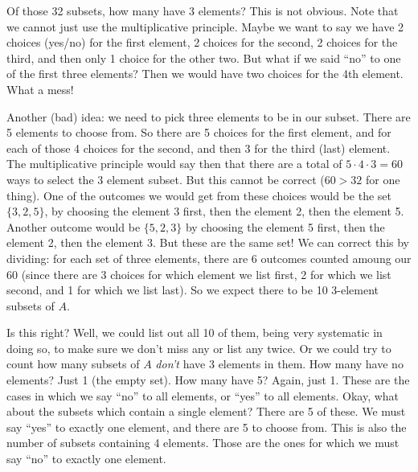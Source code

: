 \documentclass[10pt,]{book}
\theoremstyle{plain}
\theoremstyle{definition}
\theoremstyle{definition}
\theoremstyle{definition}
\numberwithin{equation}{chapter}
\begin{document}
        Of those 32 subsets, how many have 3 elements? This is not obvious. Note that we cannot just use the multiplicative principle. Maybe we want to say we have 2 choices (yes/no) for the first element, 2 choices for the second, 2 choices for the third, and then only 1 choice for the other two. But what if we said ``no'' to one of the first three elements? Then we would have two choices for the 4th element. What a mess!
\par

        Another (bad) idea: we need to pick three elements to be in our subset. There are 5 elements to choose from. So there are 5 choices for the first element, and for each of those 4 choices for the second, and then 3 for the third (last) element. The multiplicative principle would say then that there are a total of \(5 \cdot 4 \cdot 3 = 60\) ways to select the 3 element subset. But this cannot be correct (\(60 > 32\) for one thing). One of the outcomes we would get from these choices would be the set \(\{3,2,5\}\), by choosing the element 3 first, then the element 2, then the element 5. Another outcome would be \(\{5,2,3\}\) by choosing the element 5 first, then the element 2, then the element 3. But these are the same set! We can correct this by dividing: for each set of three elements, there are 6 outcomes counted amoung our 60 (since there are 3 choices for which element we list first, 2 for which we list second, and 1 for which we list last). So we expect there to be
        10 3-element subsets of \(A\).
\par

        Is this right? Well, we could list out all 10 of them, being very systematic in doing so, to make sure we don't miss any or list any twice. Or we could try to count how many subsets of \(A\) \emph{don't} have 3 elements in them. How many have no elements? Just 1 (the empty set). How many have 5? Again, just 1. These are the cases in which we say ``no'' to all elements, or ``yes'' to all elements. Okay, what about the subsets which contain a single element? There are 5 of these. We must say ``yes'' to exactly one element, and there are 5 to choose from. This is also the number of subsets containing 4 elements. Those are the ones for which we must say ``no'' to exactly one element.
\par
\end{document}
